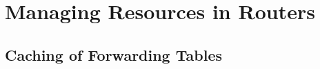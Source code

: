 \documentclass[a4paper,11pt]{book}
\begin{document}


\part{Managing Resources in Routers}

\chapter{Caching of Forwarding Tables}
\label{ch:packet-forwarding}






%



\end{document}
